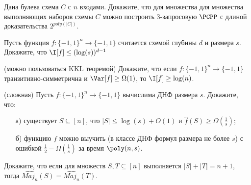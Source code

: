 \begin{task}
    Дана булева схема $C$ с $n$ входами. Докажите, что для множества для множества выполняющих наборов схемы $C$ можно построить
    $3$-запросовую $\PCPP$ с длиной доказательства $2^{poly (|C|)}$.
\end{task}


\breakline

\begin{ptask}{25}
    Пусть функция $f: \{-1, 1\}^n \to \{-1, 1\}$ считается схемой глубины $d$ и размера $s$. Докажите, что $\I[f] \le
    (\log(s))^{d - 1}$
\end{ptask}

\begin{ptask}{26}(можно пользоваться KKL теоремой)
    Докажите, что если $f:\{-1, 1\}^n \to \{-1, 1\}$ транзитивно-симметрична и $\Var[f] \ge \Omega(1)$, то $\I[f] \ge \log(n)$. 
\end{ptask}


\begin{ptask}{27}(сложная)
    Пусть $f:\{-1, 1\}^n \to \{-1, 1\}$ вычислима ДНФ размера $s$. Докажите, что:
   	\begin{enumerate}[topsep = 0pt, itemsep = -1ex]
        \item [а)] существует $S \subseteq [n]$, что $|S| \le \log(s) + O(1)$ и $\hat{f}(S) \ge \Omega(\frac{1}{s})$;
        \item [б)] функцию $f$ можно выучить (в классе ДНФ формул размера не более $s$) с ошибкой $\frac{1}{2} -
            \Omega(\frac{1}{s})$ за время $\poly(n, s)$.
	\end{enumerate}
\end{ptask}

\begin{ptask}{28}
    Докажите, что если для множеств $S, T \subseteq [n]$ выполняется $|S| + |T| = n + 1$, тогда $\widehat{Maj_n}(S) =
    \widehat{Maj_n}(T)$.
\end{ptask}



